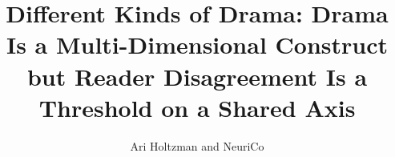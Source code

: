 \documentclass{article}
\title{Different Kinds of Drama: Drama Is a Multi-Dimensional Construct\\ but Reader Disagreement Is a Threshold on a Shared Axis}
\author{Ari Holtzman and NeuriCo}
\begin{document}
\maketitle

\begin{abstract}

\end{abstract}









\end{document}
